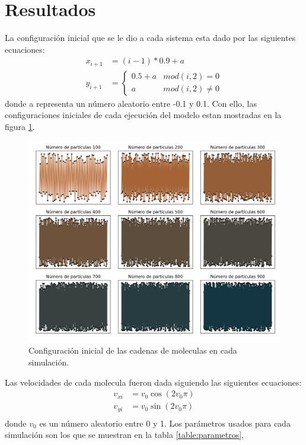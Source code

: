 \section{Resultados}
La configuración inicial que se le dio a cada sistema esta dado por las siguientes ecuaciones:
\begin{align*}
    x_{i+1}&=(i-1)*0.9+a\\
    y_{i+1}&=\left\lbrace\begin{matrix}
        0.5+a & mod(i,2)=0 \\
        a & mod(i,2)\neq 0
    \end{matrix} \right.
\end{align*}
donde a representa un número aleatorio entre -0.1 y 0.1. Con ello, las configuraciones iniciales de cada ejecución del modelo estan
mostradas en la figura \ref{fig:posini}.
\begin{figure}[H]
    \centering
    \includegraphics[scale=0.27]{../Graphics/pos_ini.png}
    \caption{Configuración inicial de las cadenas de moleculas en cada simulación.}
    \label{fig:posini}
\end{figure}
Las velocidades de cada molecula fueron dada siguiendo las siguientes ecuaciones:
\begin{align*}
    v_{xi}&=v_{0}\cos(2v_0\pi)\\
    v_{yi}&=v_{0}\sin(2v_0\pi)\\
\end{align*}
donde $v_0$ es un número aleatorio entre 0 y 1. Los parámetros usados para cada simulación son los que se muestran en la tabla \ref{table:parametros},

